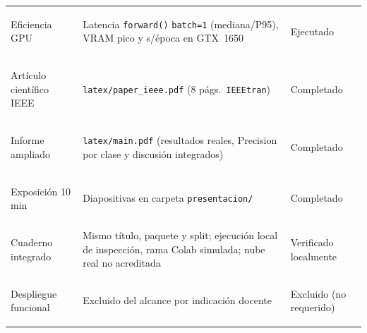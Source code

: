 {\begin{longtable}{@{}>{\bfseries\raggedright\arraybackslash}p{4.2cm}>{\raggedright\arraybackslash}p{8.0cm}>{\raggedright\arraybackslash}p{3.4cm}@{}}
Eficiencia GPU & Latencia \texttt{forward()} \texttt{batch=1} (mediana/P95), VRAM pico y s/época en GTX~1650 & Ejecutado \\
Artículo científico IEEE & \texttt{latex/paper\_ieee.pdf} (8 págs.\ \texttt{IEEEtran}) & Completado \\
Informe ampliado & \texttt{latex/main.pdf} (resultados reales, Precision por clase y discusión integrados) & Completado \\
Exposición 10 min & Diapositivas en carpeta \texttt{presentacion/} & Completado \\
Cuaderno integrado & Mismo título, paquete y split; ejecución local de inspección, rama Colab simulada; nube real no acreditada & Verificado localmente \\
Despliegue funcional & Excluido del alcance por indicación docente & Excluido (no requerido) \\
\bottomrule
\end{longtable}
}

